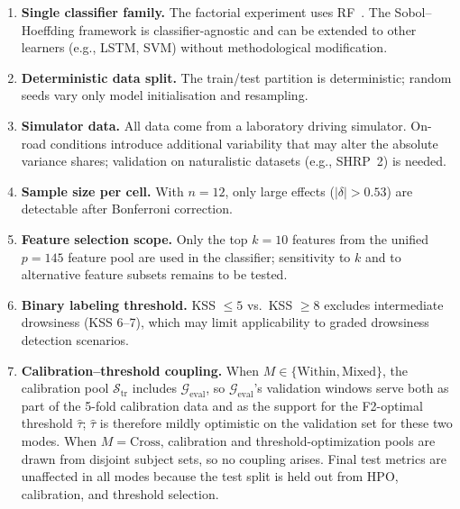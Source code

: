 \documentclass[lettersize,journal]{IEEEtran}
\begin{document}
\begin{enumerate}
\item \textbf{Single classifier family.}
The factorial experiment uses RF~\cite{breiman2001}.
The Sobol--Hoeffding framework is classifier-agnostic and can be extended to other learners (e.g., LSTM, SVM) without methodological modification.

\item \textbf{Deterministic data split.}
The train/test partition is deterministic; random seeds vary only model initialisation and resampling.

\item \textbf{Simulator data.}
All data come from a laboratory driving simulator.
On-road conditions introduce additional variability that may alter the absolute variance shares; validation on naturalistic datasets (e.g., SHRP~2) is needed.

\item \textbf{Sample size per cell.}
With $n = 12$, only large effects ($|\delta| > 0.53$) are detectable after Bonferroni correction.

\item \textbf{Feature selection scope.}
Only the top $k = 10$ features from the unified $p = 145$ feature pool are used in the classifier; sensitivity to $k$ and to alternative feature subsets remains to be tested.

\item \textbf{Binary labeling threshold.}
KSS $\leq 5$ vs.\ KSS $\geq 8$ excludes intermediate drowsiness (KSS 6--7), which may limit applicability to graded drowsiness detection scenarios.

\item \textbf{Calibration--threshold coupling.}
When $M \in \{\mathrm{Within}, \mathrm{Mixed}\}$, the calibration pool $\mathcal{S}_{\mathrm{tr}}$ includes $\mathcal{G}_{\mathrm{eval}}$, so $\mathcal{G}_{\mathrm{eval}}$'s validation windows serve both as part of the 5-fold calibration data and as the support for the F2-optimal threshold $\hat{\tau}$; $\hat{\tau}$ is therefore mildly optimistic on the validation set for these two modes. When $M = \mathrm{Cross}$, calibration and threshold-optimization pools are drawn from disjoint subject sets, so no coupling arises. Final test metrics are unaffected in all modes because the test split is held out from HPO, calibration, and threshold selection.
\end{enumerate}

\end{document}
